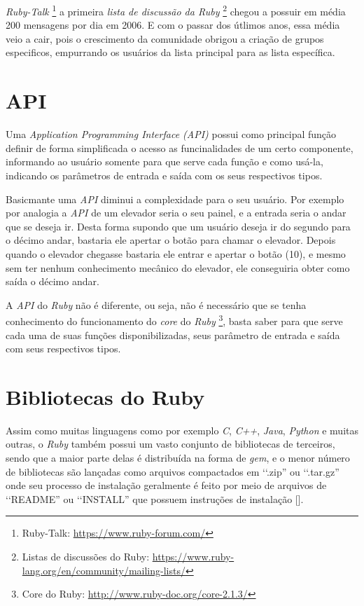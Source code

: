 \emph{Ruby-Talk} \footnote{Ruby-Talk: \url{https://www.ruby-forum.com/}} a primeira \emph{lista de 
discussão da Ruby} \footnote{Listas de discussões do Ruby: 
\url{https://www.ruby-lang.org/en/community/mailing-lists/}} chegou a possuir em média 200 mensagens por dia
em 2006. E com o passar dos útlimos anos, essa média veio a cair, pois o crescimento da comunidade 
obrigou a criação de grupos especificos, empurrando os usuários da lista principal para as lista específica.


\section{API}
\label{API}

Uma \emph{Application Programming Interface (API)} possui como principal função definir de forma simplificada 
o acesso as funcinalidades de um certo componente, informando ao usuário somente para que serve cada função 
e como usá-la, indicando os parâmetros de entrada e saída com os seus respectivos tipos. 

Basicmante uma \emph{API} diminui a complexidade para o seu usuário. Por exemplo por analogia a \emph{API} 
de um elevador seria o seu painel, e a entrada seria o andar que se deseja ir. Desta forma supondo que 
um usuário deseja ir do segundo para o décimo andar, bastaria ele apertar o botão para chamar o 
elevador. Depois quando o elevador chegasse bastaria ele entrar e apertar o botão (10), e mesmo sem ter 
nenhum conhecimento mecânico do elevador, ele conseguiria obter como saída o décimo andar.

A \emph{API} do \emph{Ruby} não é diferente, ou seja, não é necessário que se tenha
conhecimento do funcionamento do \emph{core} do \emph{Ruby} 
\footnote{ Core do Ruby: \url{http://www.ruby-doc.org/core-2.1.3/}}, basta saber para que 
serve cada uma de suas funções disponibilizadas, seus parâmetro de entrada e saída com seus respectivos tipos.

\section{Bibliotecas do Ruby}
\label{bibliotecas_do_ruby}

Assim como muitas linguagens como por exemplo \emph{C}, \emph{C++}, \emph{Java}, \emph{Python} e muitas
outras, o \emph{Ruby} também possui um vasto conjunto de bibliotecas de terceiros, sendo que a maior parte
delas é distribuída na forma de \emph{gem}, e o menor número de bibliotecas são lançadas como arquivos 
compactados em ‘‘.zip'' ou ‘‘.tar.gz'' onde seu processo de instalação geralmente é feito por meio de 
arquivos de ‘‘README'' ou ‘‘INSTALL'' que possuem instruções de instalação [].

